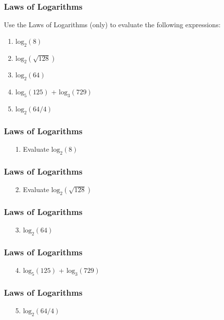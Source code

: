 \documentclass{beamer}
\begin{document}
\begin{frame}
\frametitle{Laws of Logarithms}
\Large
\vspace{-1cm}
Use the Laws of Logarithms (only) to evaluate the following expressions:
\begin{enumerate}
\item $\mbox{log}_2(8)$
\item $\mbox{log}_2(\sqrt{128})$
\item $\mbox{log}_2(64)$
\item $\mbox{log}_5(125)$ +   $\mbox{log}_3(729)$
\item $\mbox{log}_2(64/4)$
\end{enumerate}
\end{frame}
\begin{frame}
\frametitle{Laws of Logarithms}
\Large
\vspace{-3cm}
\begin{enumerate}
\item[1.] Evaluate $\mbox{log}_2(8)$
\end{enumerate}
\end{frame}
\begin{frame}
\frametitle{Laws of Logarithms}
\Large
\vspace{-3cm}
\begin{enumerate}
\item[2.] Evaluate $\mbox{log}_2(\sqrt{128})$
\end{enumerate}
\end{frame}
\begin{frame}
\frametitle{Laws of Logarithms}
\Large
\vspace{-3cm}
\begin{enumerate}
\item[3.] $\mbox{log}_2(64)$
\end{enumerate}
\end{frame}
\begin{frame}
\frametitle{Laws of Logarithms}
\Large
\vspace{-3cm}
\begin{enumerate}
\item[4.] $\mbox{log}_5(125)$ +   $\mbox{log}_3(729)$
\end{enumerate}
\end{frame}
\begin{frame}
\frametitle{Laws of Logarithms}
\Large
\vspace{-3cm}
\begin{enumerate}
\item[5.] $\mbox{log}_2(64/4)$
\end{enumerate}
\end{frame}
\begin{frame}

\end{frame}
\end{document}
